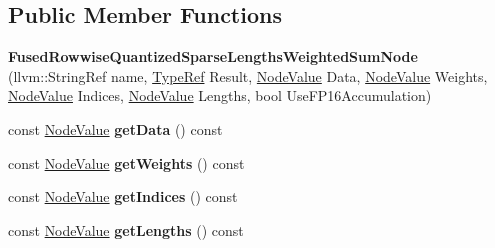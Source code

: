 \subsection*{Public Member Functions}
\begin{DoxyCompactItemize}
\item 
\mbox{\label{classglow_1_1_fused_rowwise_quantized_sparse_lengths_weighted_sum_node_ab11afdbe704fc889f69e0d02669c0d5f}} 
{\bfseries Fused\+Rowwise\+Quantized\+Sparse\+Lengths\+Weighted\+Sum\+Node} (llvm\+::\+String\+Ref name, \hyperlink{structglow_1_1_type}{Type\+Ref} Result, \hyperlink{structglow_1_1_node_value}{Node\+Value} Data, \hyperlink{structglow_1_1_node_value}{Node\+Value} Weights, \hyperlink{structglow_1_1_node_value}{Node\+Value} Indices, \hyperlink{structglow_1_1_node_value}{Node\+Value} Lengths, bool Use\+F\+P16\+Accumulation)
\item 
\mbox{\label{classglow_1_1_fused_rowwise_quantized_sparse_lengths_weighted_sum_node_a8a20831fecaa00be4b29a908b10dd719}} 
const \hyperlink{structglow_1_1_node_value}{Node\+Value} {\bfseries get\+Data} () const
\item 
\mbox{\label{classglow_1_1_fused_rowwise_quantized_sparse_lengths_weighted_sum_node_aebe406b047f370fb40aa3d1d2e3e6185}} 
const \hyperlink{structglow_1_1_node_value}{Node\+Value} {\bfseries get\+Weights} () const
\item 
\mbox{\label{classglow_1_1_fused_rowwise_quantized_sparse_lengths_weighted_sum_node_a9b91ada13b64d9315a8b8a519777b3a4}} 
const \hyperlink{structglow_1_1_node_value}{Node\+Value} {\bfseries get\+Indices} () const
\item 
\mbox{\label{classglow_1_1_fused_rowwise_quantized_sparse_lengths_weighted_sum_node_a9031758d0d1b396070b4b9438d5199f8}} 
const \hyperlink{structglow_1_1_node_value}{Node\+Value} {\bfseries get\+Lengths} () const
\item 
\mbox{\label{classglow_1_1_fused_rowwise_quantized_sparse_lengths_weighted_sum_node_ab7824fb8427aefb2274a2690609ad3d0}} 

\end{DoxyCompactItemize}
